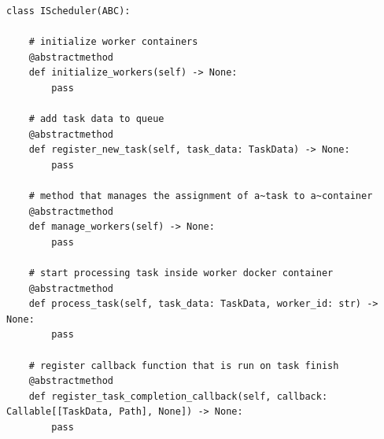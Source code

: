 \lstset{style=python}
\begin{lstlisting}[caption = {Interfejs orkiestratora kontenerów.}]
	class IScheduler(ABC):

    # initialize worker containers
    @abstractmethod
    def initialize_workers(self) -> None:
        pass
     
    # add task data to queue 
    @abstractmethod
    def register_new_task(self, task_data: TaskData) -> None:
        pass

    # method that manages the assignment of a~task to a~container
    @abstractmethod
    def manage_workers(self) -> None:
        pass

    # start processing task inside worker docker container
    @abstractmethod
    def process_task(self, task_data: TaskData, worker_id: str) -> None:
        pass

    # register callback function that is run on task finish
    @abstractmethod
    def register_task_completion_callback(self, callback: Callable[[TaskData, Path], None]) -> None:
        pass
\end{lstlisting}

